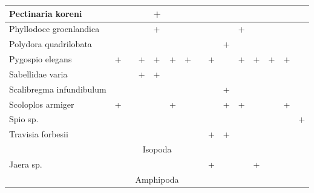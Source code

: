 \begin{footnotesize}
\begin{longtable}{|p{2cm}|p{0.4cm}p{0.4cm}|p{0.4cm}p{0.4cm}|p{0.4cm}p{0.4cm}|p{0.35cm}p{0.35cm}p{0.35cm}|p{1cm}|p{0.5cm}p{0.5cm}|p{1cm}|p{1cm}|}
Pectinaria koreni         &           &           &           & +         &           &           &          &          &          &                 &          &          &          &            \\  \hline
Phyllodoce groenlandica   &           &           &           & +         &           &           &          &          &          & +               &          &          &          &            \\  \hline
Polydora quadrilobata     &           &           &           &           &           &           &          &          & +        &                 &          &          &          &            \\  \hline
Pygospio elegans          & +         &           & +         & +         & +         & +         &          & +        &          & +               & +        & +        & +        &            \\  \hline
Sabellidae varia          &           &           & +         & +         &           &           &          &          &          &                 &          &          &          &            \\  \hline
Scalibregma infundibulum  &           &           &           &           &           &           &          &          & +        &                 &          &          &          &            \\  \hline
Scoloplos armiger         & +         &           &           &           & +         &           &          &          & +        & +               &          &          & +        &            \\  \hline
Spio sp.                  &           &           &           &           &           &           &          &          &          &                 &          &          &          & +          \\  \hline
Travisia forbesii         &           &           &           &           &           &           &          & +        & +        &                 &          &          &          &            \\ \hline
\multicolumn{15}{|c|}{Isopoda} \\ \hline
Jaera sp.                 &           &           &           &           &           &           &          & +        &          &                 & +        &          &          &            \\ \hline
\multicolumn{15}{|c|}{Amphipoda} \\ \hline

\end{longtable}
\end{footnotesize}
